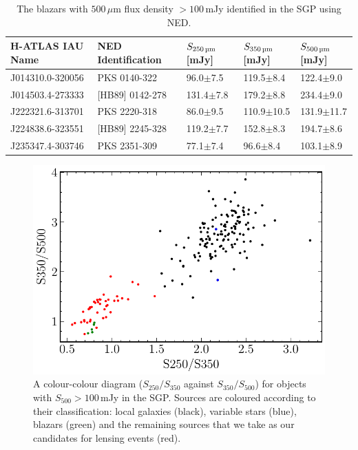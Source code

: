 \begin{table}
    \centering
    \begin{tabular}{p{3.75cm}|p{3.25cm}|p{2cm}|p{2cm}|p{2cm}}
        \hline
        \hline
        H-ATLAS IAU Name & NED Identification & $S_{\textrm{250\,\micron}}$ [mJy] & $S_{\textrm{350\,\micron}}$ [mJy] & $S_{\textrm{500\,\micron}}$ [mJy] \\
        \hline
        \hline
        J014310.0-320056 & PKS 0140-322 & 96.0$\pm$7.5 & 119.5$\pm$8.4 & 122.4$\pm$9.0 \\
        J014503.4-273333 & [HB89] 0142-278 & 131.4$\pm$7.8 & 179.2$\pm$8.8 & 234.4$\pm$9.0 \\
        J222321.6-313701 & PKS 2220-318 & 86.0$\pm$9.5 & 110.9$\pm$10.5 & 131.9$\pm$11.7 \\
        J224838.6-323551 & [HB89] 2245-328 & 119.2$\pm$7.7 & 152.8$\pm$8.3 & 194.7$\pm$8.6 \\
        J235347.4-303746 & PKS 2351-309 & 77.1$\pm$7.4 & 96.6$\pm$8.4 & 103.1$\pm$8.9 \\
        \hline
    \end{tabular}
    \caption[Blazars in the SGP with $S_{500} > 100\,$mJy]{The blazars with $500\,\mu$m flux density $> 100\,$mJy identified in the SGP using NED.}
    \label{tab:blazars}
\end{table}

\begin{figure}
    \centering
    \includegraphics[width=0.75\columnwidth]{Figures/submm_colours_lensed_candidates.pdf}
    \caption[$S_{250}/S_{350}$ against $S_{350}/S_{500}$ diagram of SGP sources with $S_{500} > 100\,$mJy]{A colour-colour diagram ($S_{250}/S_{350}$ against $S_{350}/S_{500}$) for objects with $S_{500} > 100\,$mJy in the SGP. Sources are coloured according to their classification: local galaxies (black), variable stars (blue), blazars (green) and the remaining sources that we take as our candidates for lensing events (red).}
    \label{fig:submm_colours_lensed_candidates}
\end{figure}

